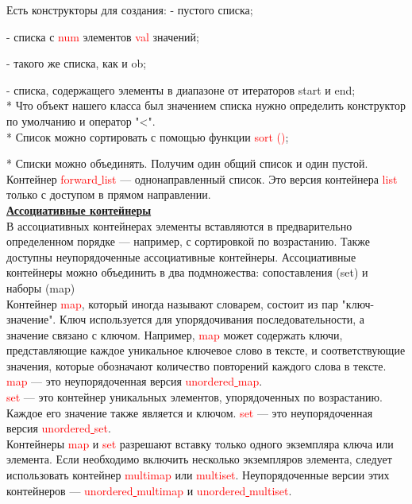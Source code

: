 \documentclass[a4paper,10pt]{article}
\begin{document}
Есть конструкторы для создания:
	- пустого списка;
	
	- списка с \textcolor{red}{num} элементов \textcolor{red}{val} значений;
	
	- такого же списка, как и ob;
	
	- списка, содержащего элементы в диапазоне от итераторов start и end;
\\

* Что объект нашего класса был значением списка нужно определить конструктор по умолчанию и оператор "<".
\\

* Список можно сортировать с помощью функции \textcolor{red}{sort ()};

* Списки можно объединять. Получим один общий список и один пустой.
\\

Контейнер \textcolor{red}{forward\underline{ }list} — однонаправленный список. Это версия контейнера \textcolor{red}{list} только с доступом в прямом направлении.
\\

\textbf{\underline{Ассоциативные контейнеры}}
\\

В ассоциативных контейнерах элементы вставляются в предварительно определенном порядке — например, с сортировкой по возрастанию. Также доступны неупорядоченные ассоциативные контейнеры. Ассоциативные контейнеры можно объединить в два подмножества: сопоставления (set) и наборы (map)
\\

Контейнер \textcolor{red}{map}, который иногда называют словарем, состоит из пар "ключ-значение". Ключ используется для упорядочивания последовательности, а значение связано с ключом. Например, \textcolor{red}{map} может содержать ключи, представляющие каждое уникальное ключевое слово в тексте, и соответствующие значения, которые обозначают количество повторений каждого слова в тексте. \textcolor{red}{map} — это неупорядоченная версия \textcolor{red}{unordered\underline{ }map}.
\\

\textcolor{red}{set} — это контейнер уникальных элементов, упорядоченных по возрастанию. Каждое его значение также является и ключом. \textcolor{red}{set} — это неупорядоченная версия \textcolor{red}{unordered\underline{ }set}.
\\

Контейнеры \textcolor{red}{map} и \textcolor{red}{set} разрешают вставку только одного экземпляра ключа или элемента. Если необходимо включить несколько экземпляров элемента, следует использовать контейнер \textcolor{red}{multimap} или \textcolor{red}{multiset}. Неупорядоченные версии этих контейнеров — \textcolor{red}{unordered\underline{ }multimap} и \textcolor{red}{unordered\underline{ }multiset}.
\\
\end{document}
